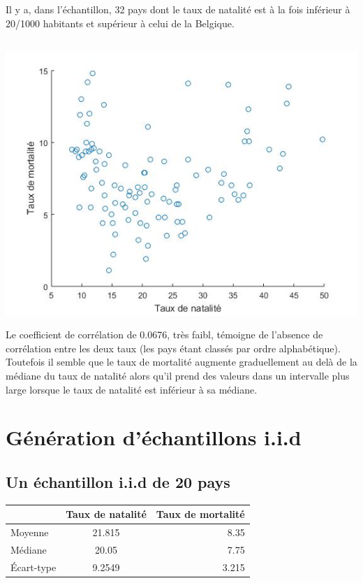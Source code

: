 \documentclass[a4paper,10pt]{article}
\begin{document}
Il y a, dans l'échantillon, 32 pays dont le taux de natalité est à la fois inférieur à 20/1000 habitants et supérieur à celui de la Belgique.


\subsection{ }

\begin{center}
	\includegraphics[scale=0.5]{Figure4.jpg}
\end{center}


Le coefficient de corrélation de 0.0676, très faibl, témoigne de l'absence de corrélation entre les deux taux (les pays étant classés par ordre alphabétique). Toutefois il semble que le taux de mortalité augmente graduellement au delà de la médiane du taux de natalité alors qu'il prend des valeurs dans un intervalle plus large lorsque le taux de natalité est inférieur à sa médiane.

\section{Génération d'échantillons i.i.d}

\subsection{Un échantillon i.i.d de 20 pays}

\begin{tabular}{|l|c|r|}
	\hline
	 & Taux de natalité & Taux de mortalité\\
	\hline
	Moyenne & 21.815 &  8.35 \\
	Médiane & 20.05  & 7.75\\
	Écart-type & 9.2549 & 3.215 \\
	\hline
\end{tabular}
\\
\end{document}
